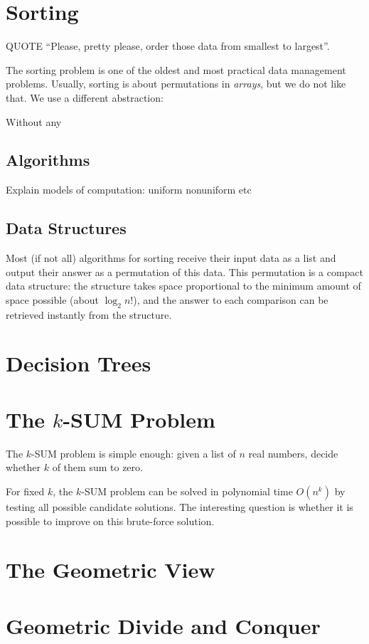 \chapter{Sorting}

QUOTE ``Please, pretty please, order those data from smallest to largest''.

The sorting problem is one of the oldest and most practical data management
problems.
%
Usually, sorting is about permutations in \emph{arrays}, but we do not like
that. We use a different abstraction:



Without any

\section{Algorithms}
Explain models of computation: uniform nonuniform etc

\section{Data Structures}

Most (if not all) algorithms for sorting receive their input data as a list and
output their answer as a permutation of this data. This permutation is a
compact data structure: the structure takes space proportional to the minimum
amount of space possible (about \(\log_2 n!\)), and the answer to each
comparison can be retrieved instantly from the structure.


\chapter{Decision Trees}

\chapter{The \(k\)-SUM Problem}

The \(k\)-SUM problem is simple enough: given a list of \(n\) real numbers,
decide whether \(k\) of them sum to zero.



For fixed \(k\), the \(k\)-SUM problem can be solved in polynomial time
\(O(n^k)\) by testing all possible candidate solutions.
The interesting question is whether it is possible to improve on
this brute-force solution.

\chapter{The Geometric View}

\chapter{Geometric Divide and Conquer}
